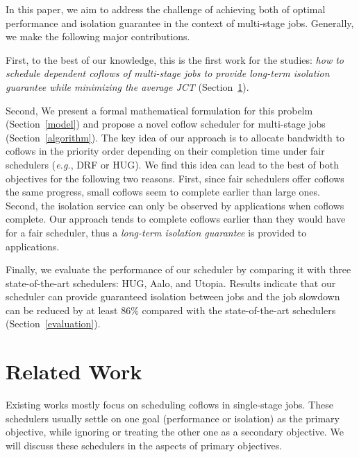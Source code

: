 \documentclass[10pt, conference, letterpaper]{IEEEtran}
\begin{document}
In this paper, we aim to address the challenge of achieving both of optimal performance and isolation guarantee in the context of multi-stage jobs. Generally, we make the following major contributions.

First, to the best of our knowledge, this is the first work for the studies: \emph{how to schedule dependent coflows of multi-stage jobs to provide long-term isolation guarantee while minimizing the average JCT} (Section~\ref{related}).

Second, We present a formal mathematical formulation for this probelm (Section~\ref{model}) and propose a novel coflow scheduler for multi-stage jobs (Section~\ref{algorithm}). The key idea of our approach is to allocate bandwidth to coflows in the priority order depending on their completion time under fair schedulers (\emph{e.g.}, DRF\cite{DRF} or HUG\cite{HUG}). We find this idea can lead to the best of both objectives for the following two reasons. First, since fair schedulers offer coflows the same progress, small coflows seem to complete earlier than large ones. %
Second, the isolation service can only be observed by applications when coflows complete. Our approach tends to complete coflows earlier than they would have for a fair scheduler, thus a \emph{long-term isolation guarantee} is provided to applications. %

Finally, we evaluate the performance of our scheduler by comparing it with three state-of-the-art schedulers: HUG\cite{HUG}, Aalo\cite{aalo}, and Utopia\cite{utopia}. Results indicate that our scheduler can provide guaranteed isolation between jobs and the job slowdown can be reduced by at least 86\% compared with the state-of-the-art schedulers (Section~\ref{evaluation}).

\section{Related Work}\label{related}
Existing works mostly focus on scheduling coflows in single-stage jobs. These schedulers usually settle on one goal (performance or isolation) as the primary objective, while ignoring or treating the other one as a secondary objective. We will discuss these schedulers in the aspects of primary objectives.
\end{document}

